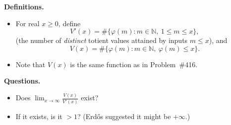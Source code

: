 \textbf{Definitions.}
\begin{itemize}
\item For real $x\ge 0$, define
\[
V'(x)=\#\{\varphi(m): m\in\mathbb{N},\ 1\le m\le x\},
\]
(the number of \emph{distinct} totient values attained by inputs $m\le x$), and
\[
V(x)=\#\{\varphi(m): m\in\mathbb{N},\ \varphi(m)\le x\}.
\]
\item Note that $V(x)$ is the same function as in Problem~\#416.
\end{itemize}

\textbf{Questions.}
\begin{itemize}
\item[(Q1)] Does $\displaystyle \lim_{x\to\infty} \frac{V(x)}{V'(x)}$ exist?
\item[(Q2)] If it exists, is it $>1$? (Erd\H{o}s suggested it might be $+\infty$.)
\end{itemize}

